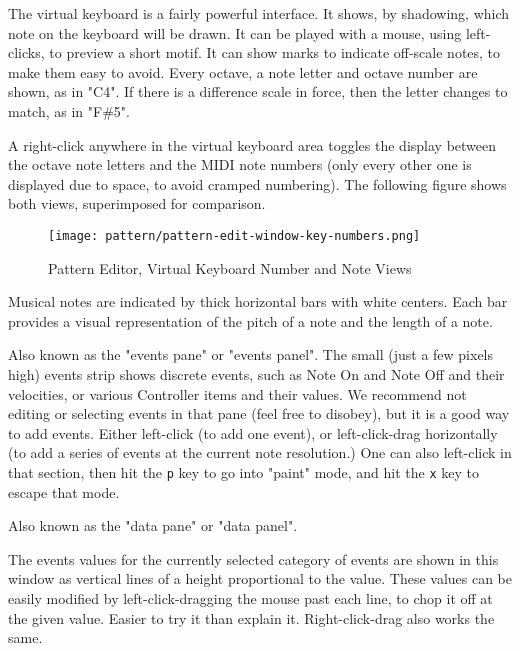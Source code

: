    The virtual keyboard is a fairly powerful interface.  It shows,
   by shadowing, which note on the keyboard will be drawn. It can be
   played with a mouse, using left-clicks, to preview a short motif.
   It can show marks to indicate off-scale notes, to make them easy to
   avoid.  Every octave, a note letter and octave number are shown, as in
   "C4".  If there is a difference scale in force, then the letter changes to
   match, as in "F\#5".

   A right-click anywhere in the virtual keyboard area toggles the display
   between the octave note letters and the MIDI note numbers (only every other
   one is displayed due to space, to avoid cramped numbering).
   The following figure shows both views, superimposed for comparison.

\begin{figure}[H]
   \centering 
   \texttt{[image: pattern/pattern-edit-window-key-numbers.png]}
   \caption{Pattern Editor, Virtual Keyboard Number and Note Views}
   \label{fig:pattern_editor_key_numbers}
\end{figure}

   Musical notes are indicated by thick horizontal bars with white
   centers.  Each bar provides
   a visual representation of the pitch of a note and the length of a note.

   Also known as the "events pane" or "events panel".
   The small (just a few pixels high) events strip shows discrete events,
   such as Note On and Note Off and their velocities, or various Controller
   items and their values.  We recommend not editing or selecting events
   in that pane (feel free to disobey), but it is a good way to add events.
   Either
   left-click (to add one event),
   or left-click-drag horizontally (to add a
   series of events at the current note resolution.)  One can also
   left-click in that section,
   then hit the \texttt{p} key to go into "paint" mode,
   and hit the \texttt{x} key to escape that mode.

   Also known as the "data pane"
   or "data panel".

   The events values for the currently selected category of events are shown
   in this window as vertical lines of a height proportional to the value.
   These values can be easily modified by
   left-click-dragging the
   mouse past each line, to chop it off at the given value.  Easier to try
   it than explain it.
   Right-click-drag also works the same.

